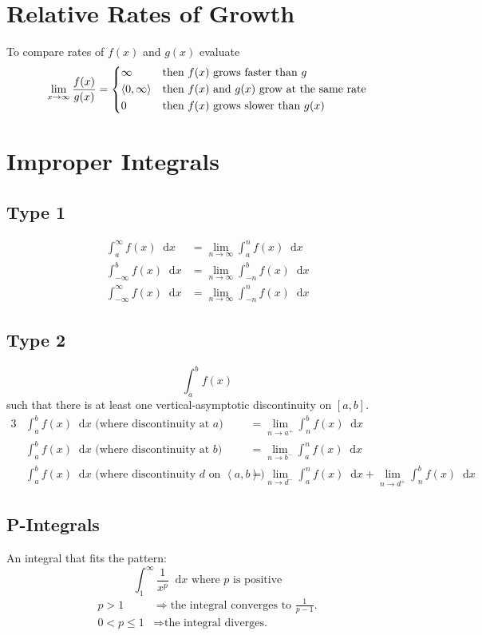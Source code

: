 \documentclass[12pt]{article}
\renewcommand*{\implies}{\Rightarrow}
\newcommand*{\D}[1]{\mathop{}\!\mathrm{d} #1}
\newenvironment{rmaskip}{\setlength{\abovedisplayskip}{0pt}\ignorespaces}%
  {\ignorespacesafterend}
\newenvironment{rmbskip}{\setlength{\belowdisplayskip}{0pt}\ignorespaces}%
  {\ignorespacesafterend}
\newenvironment{rmskip}{\setlength{\abovedisplayskip}{0pt}%
  \setlength{\belowdisplayskip}{0pt}\ignorespaces}%
  {\ignorespacesafterend}
\begin{document}
\section*{Relative Rates of Growth}
To compare rates of \(f(x)\) and \(g(x)\) evaluate
\begin{rmbskip}
  \[
    \lim_{x \to \infty} \frac{f(x)}{g(x)} =
    \begin{dcases*}
      \infty & then \(f(x)\) grows faster than \(g\)\\
      \left<0, \infty\right> & then \(f(x)\) and \(g(x)\) grow at the same
        rate\\
      0 & then \(f(x)\) grows slower than \(g(x)\)
    \end{dcases*}
  \]
\end{rmbskip}
\section*{Improper Integrals}
\subsection*{Type 1}
\begin{rmskip}
  \begin{align*}
    \int_a^\infty f(x) \D{x} &= \lim_{n \to \infty} \int_a^n f(x) \D{x}\\
    \int_{-\infty}^b f(x) \D{x} &= \lim_{n \to \infty} \int_{-n}^b f(x) \D{x}\\
    \int_{-\infty}^\infty f(x) \D{x} &= \lim_{n \to \infty} \int_{-n}^n f(x)
      \D{x}
  \end{align*}
\end{rmskip}
\subsection*{Type 2}
\[
  \int_a^b f(x)
\]
such that there is at least one vertical-asymptotic discontinuity on \([a,b]\).
\begin{alignat*}{3}
  &\int_a^b f(x) \D{x} \text{ (where discontinuity at \(a\)) }
    &&= \lim_{n \to a^+} \int_n^b f(x) \D{x}\\
  &\int_a^b f(x) \D{x} \text{ (where discontinuity at \(b\)) }
    &&= \lim_{n \to b^-} \int_a^n f(x) \D{x}\\
  &\int_a^b f(x) \D{x} \text{ (where discontinuity \(d\) on
    \(\left<a,b\right>\)) } &&= \lim_{n \to d^-} \int_a^n f(x) \D{x} +
    \lim_{n \to d^+} \int_n^b f(x) \D{x}
\end{alignat*}
\subsection*{P-Integrals}
An integral that fits the pattern:
\[
  \int_1^\infty \frac{1}{x^p} \D{x} \text{ where \(p\) is positive}
\]
\begin{rmaskip}
  \begin{align*}
    p > 1 &\implies \text{the integral converges to \(\tfrac{1}{p-1}\).}\\
    0 < p \le 1 &\implies \text{the integral diverges.}
  \end{align*}
\end{rmaskip}
\end{document}
